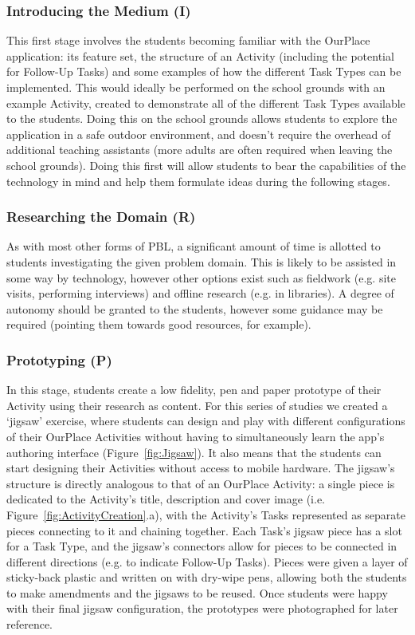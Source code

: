 \documentclass[,hyphens]{sigchi}
\begin{document}
\subsubsection{Introducing the Medium (I)}
This first stage involves the students becoming familiar with the OurPlace application: its feature set, the structure of an Activity (including the potential for Follow-Up Tasks) and some examples of how the different Task Types can be implemented. This would ideally be performed on the school grounds with an example Activity, created to demonstrate all of the different Task Types available to the students. Doing this on the school grounds allows students to explore the application in a safe outdoor environment, and doesn't require the overhead of additional teaching assistants (more adults are often required when leaving the school grounds). Doing this first will allow students to bear the capabilities of the technology in mind and help them formulate ideas during the following stages.

\subsubsection{Researching the Domain (R)}
As with most other forms of PBL, a significant amount of time is allotted to students investigating the given problem domain. This is likely to be assisted in some way by technology, however other options exist such as fieldwork (e.g. site visits, performing interviews) and offline research (e.g. in libraries). A degree of autonomy should be granted to the students, however some guidance may be required (pointing them towards good resources, for example).

\subsubsection{Prototyping (P)}
In this stage, students create a low fidelity, pen and paper prototype of their Activity using their research as content. For this series of studies we created a `jigsaw' exercise, where students can design and play with different configurations of their OurPlace Activities without having to simultaneously learn the app's authoring interface (Figure~\ref{fig:Jigsaw}). It also means that the students can start designing their Activities without access to mobile hardware. The jigsaw's structure is directly analogous to that of an OurPlace Activity: a single piece is dedicated to the Activity's title, description and cover image (i.e. Figure~\ref{fig:ActivityCreation}.a), with the Activity's Tasks represented as separate pieces connecting to it and chaining together. Each Task's jigsaw piece has a slot for a Task Type, and the jigsaw's connectors allow for pieces to be connected in different directions (e.g. to indicate Follow-Up Tasks). Pieces were given a layer of sticky-back plastic and written on with dry-wipe pens, allowing  both the students to make amendments and the jigsaws to be reused. Once students were happy with their final jigsaw configuration, the prototypes were photographed for later reference.
\end{document}

